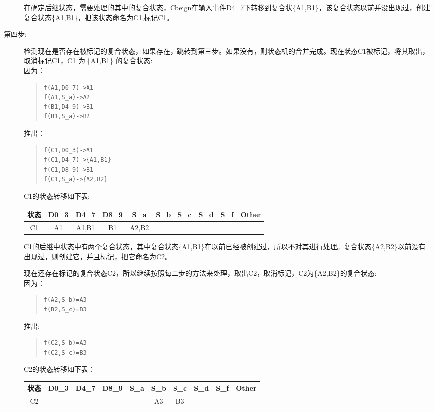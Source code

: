\begin{description}
在确定后继状态，需要处理的其中的复合状态，Cbeign在输入事件D4\_7下转移到复合状\{A1,B1\}，该复合状态以前并没出现过，创建复合状态\{A1,B1\}，把该状态命名为C1,标记C1。
\item[第四步:] 检测现在是否存在被标记的复合状态，如果存在，跳转到第三步。如果没有，则状态机的合并完成。现在状态C1被标记，将其取出，取消标记C1，C1 为 \{A1,B1\} 的复合状态:\\
因为：
\begin{quote}
\begin{verbatim}
f(A1,D0_7)->A1
f(A1,S_a)->A2
f(B1,D4_9)->B1
f(B1,S_a)->B2
\end{verbatim}
\end{quote}
推出：
\begin{quote}
\begin{verbatim}
f(C1,D0_3)->A1
f(C1,D4_7)->{A1,B1}
f(C1,D8_9)->B1
f(C1,S_a)->{A2,B2}
\end{verbatim}
\end{quote}

C1的状态转移如下表:

\begin{tabular}[c]{c|c|c|c|c|c|c|c|c|c}
状态&	D0\_3&D4\_7&D8\_9&S\_a&S\_b&S\_c&S\_d&S\_f&Other \\
\hline
C1&A1&A1,B1&B1&A2,B2&&&&& \\
\hline
\end{tabular}

C1的后继中状态中有两个复合状态，其中复合状态\{A1,B1\}在以前已经被创建过，所以不对其进行处理。复合状态\{A2,B2\}以前没有出现过，则创建它，并且标记，把它命名为C2。

现在还存在标记的复合状态C2，所以继续按照每二步的方法来处理，取出C2，取消标记，C2为\{A2,B2\}的复合状态: \\
因为：
\begin{quote}
\begin{verbatim}
f(A2,S_b)=A3
f(B2,S_c)=B3
\end{verbatim}
\end{quote}
推出:
\begin{quote}
\begin{verbatim}
f(C2,S_b)=A3
f(C2,S_c)=B3
\end{verbatim}
\end{quote}

C2的状态转移如下表：

\begin{tabular}[c]{c|c|c|c|c|c|c|c|c|c}
状态&	D0\_3&D4\_7&D8\_9&S\_a&S\_b&S\_c&S\_d&S\_f&Other \\
\hline
C2&&&&&A3&B3&&& \\
\hline
\end{tabular}
\end{description}

